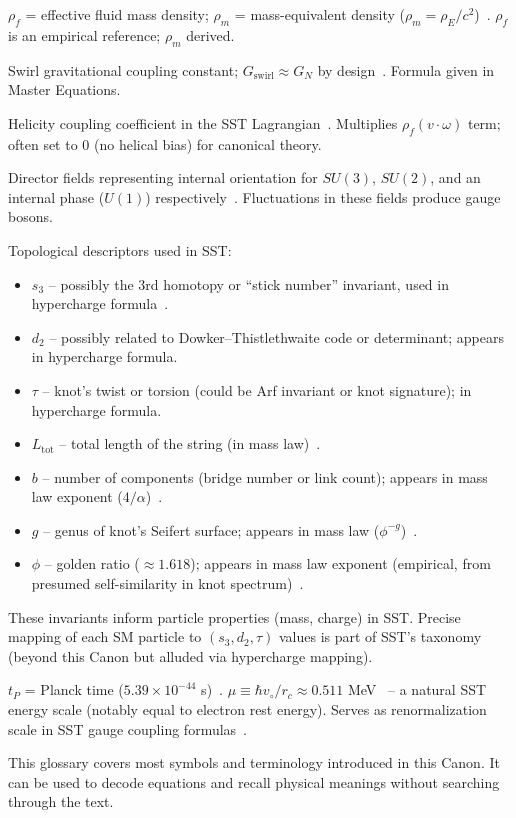 \documentclass[aps,onecolumn,10pt,nofootinbib]{revtex4}
\begin{document}
\begin{description}[leftmargin=1.3cm,labelsep=0.4cm, itemsep=1ex]
		\item[\textbf{$\rho_f, \rho_m$:}] $\rho_f$ = effective fluid mass density; $\rho_m$ = mass-equivalent density ($\rho_m = \rho_E/c^2$)~\cite{index140}. $\rho_f$ is an empirical reference; $\rho_m$ derived.
		\item[\textbf{$G_{\text{swirl}}$:}] Swirl gravitational coupling constant; $G_{\text{swirl}} \approx G_N$ by design~\cite{index141}. Formula given in Master Equations.
		\item[\textbf{$\chi_h$:}] Helicity coupling coefficient in the SST Lagrangian~\cite{index142}. Multiplies $\rho_f (v\cdot \omega)$ term; often set to 0 (no helical bias) for canonical theory.
		\item[\textbf{$\mathbf{U}_3, \mathbf{U}_2, \vartheta$:}] Director fields representing internal orientation for $SU(3)$, $SU(2)$, and an internal phase ($U(1)$) respectively~\cite{index143}. Fluctuations in these fields produce gauge bosons.
		\item[\textbf{Knot invariants $(s_3, d_2, \tau, L_{\text{tot}}, b, g, \phi)$:}] Topological descriptors used in SST:
		\begin{itemize}
			\item $s_3$ – possibly the 3rd homotopy or “stick number” invariant, used in hypercharge formula~\cite{index144}.
			\item $d_2$ – possibly related to Dowker–Thistlethwaite code or determinant; appears in hypercharge formula.
			\item $\tau$ – knot’s twist or torsion (could be Arf invariant or knot signature); in hypercharge formula.
			\item $L_{\text{tot}}$ – total length of the string (in mass law)~\cite{index145}.
			\item $b$ – number of components (bridge number or link count); appears in mass law exponent ($4/\alpha$)~\cite{index146}.
			\item $g$ – genus of knot’s Seifert surface; appears in mass law ($\phi^{-g}$)~\cite{index147}.
			\item $\phi$ – golden ratio ($\approx1.618$); appears in mass law exponent (empirical, from presumed self-similarity in knot spectrum)~\cite{index148}.
		\end{itemize}
		These invariants inform particle properties (mass, charge) in SST. Precise mapping of each SM particle to $(s_3, d_2, \tau)$ values is part of SST’s taxonomy (beyond this Canon but alluded via hypercharge mapping).
		\item[\textbf{Planck/core scales $(t_P, \mu)$:}] $t_P$ = Planck time ($5.39\times10^{-44}$ s)~\cite{index149}. $\mu \equiv \hbar v_{\circ}/r_c \approx0.511$ MeV~\cite{index150} – a natural SST energy scale (notably equal to electron rest energy). Serves as renormalization scale in SST gauge coupling formulas~\cite{index151}.
	\end{description}

	This glossary covers most symbols and terminology introduced in this Canon. It can be used to decode equations and recall physical meanings without searching through the text.
\end{document}
